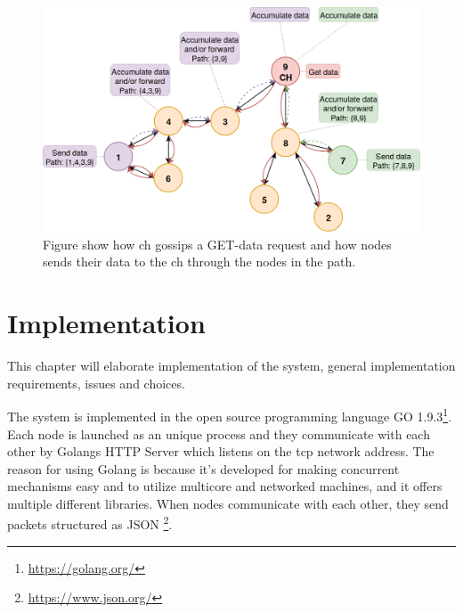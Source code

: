 \documentclass[USenglish]{uit-thesis}
\begin{document}

\begin{figure}
\centering
\includegraphics[width=\textwidth]{gatherSendData1.png}
\caption{Figure show how \gls{ch} gossips a GET-data request and how  nodes sends their data to the \gls{ch} through the nodes in the path.}
\label{fig:gaterSendData}
\end{figure}



\chapter{Implementation} \label{chap:implementation}
\glsresetall

This chapter will elaborate implementation of the system, general implementation requirements, issues and choices. 

The system is implemented in the open source programming language GO 1.9.3\footnote{\url{https://golang.org/}}. Each node is launched as an unique process and they communicate with each other by Golangs HTTP Server which listens on the \gls{tcp} network address. The reason for using Golang is because it's developed for making concurrent mechanisms easy and to utilize multicore and networked machines, and it offers multiple different libraries. When nodes communicate with each other, they send packets structured as JSON \footnote{\url{https://www.json.org/}}.
\end{document}
